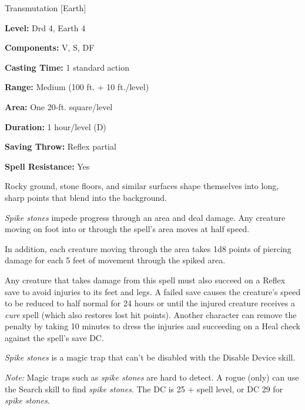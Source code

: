 
Transmutation [Earth]

\textbf{Level:} Drd 4, Earth 4

\textbf{Components:} V, S, DF

\textbf{Casting Time:} 1 standard action

\textbf{Range:} Medium (100 ft. + 10 ft./level)

\textbf{Area:} One 20-ft. square/level

\textbf{Duration:} 1 hour/level (D)

\textbf{Saving Throw:} Reflex partial

\textbf{Spell Resistance:} Yes

Rocky ground, stone floors, and similar surfaces shape themselves into long, sharp 
points that blend into the background.

\textit{Spike stones} impede progress through an area and deal damage. Any creature 
moving on foot into or through the spell's area moves at half speed.

In addition, each creature moving through the area takes 1d8 points of piercing 
damage for each 5 feet of movement through the spiked area.

Any creature that takes damage from this spell must also succeed on a Reflex save 
to avoid injuries to its feet and legs. A failed save causes the creature's speed 
to be reduced to half normal for 24 hours or until the injured creature receives 
a \textit{cure} spell (which also restores lost hit points). Another character 
can remove the penalty by taking 10 minutes to dress the injuries and succeeding 
on a Heal check against the spell's save DC.

\textit{Spike stones} is a magic trap that can't be disabled with the Disable Device 
skill.

\textit{Note:} Magic traps such as \textit{spike stones} are hard to detect. A 
rogue (only) can use the Search skill to find \textit{spike stones}. The DC is 
25 + spell level, or DC 29 for \textit{spike stones}.


